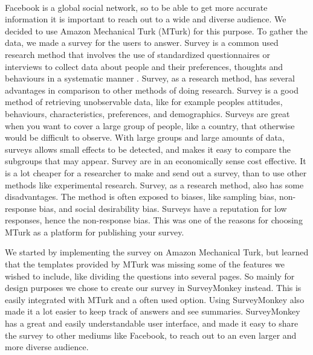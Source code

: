 \paragraph{}
Facebook is a global social network, so to be able to get more accurate information it is important to reach out to a wide and diverse audience. We decided to use Amazon Mechanical Turk (MTurk) for this purpose. To gather the data, we made a survey for the users to answer. Survey is a common used research method that involves the use of standardized questionnaires or interviews to collect data about people and their preferences, thoughts and behaviours in a systematic manner \cite{survey}. Survey, as a research method, has several advantages in comparison to other methods of doing research. Survey is a good method of retrieving unobservable data, like for example peoples attitudes, behaviours, characteristics, preferences, and demographics. Surveys are great when you want to cover a large group of people, like a country, that otherwise would be difficult to observe. With large groups and large amounts of data, surveys allows small effects to be detected, and makes it easy to compare the subgroups that may appear. Survey are in an economically sense cost effective. It is a lot cheaper for a researcher to make and send out a survey, than to use other methods like experimental research. Survey, as a research method, also has some disadvantages. The method is often exposed to biases, like sampling bias, non-response bias, and social desirability bias. Surveys have a reputation for low responses, hence the non-response bias. This was one of the reasons for choosing MTurk as a platform for publishing your survey. 

We started by implementing the survey on Amazon Mechanical Turk, but learned that the templates provided by MTurk was missing some of the features we wished to include, like dividing the questions into several pages. So mainly for design purposes we chose to create our survey in SurveyMonkey instead. This is easily integrated with MTurk and a often used option. Using SurveyMonkey also made it a lot easier to keep track of answers and see summaries. SurveyMonkey has a great and easily understandable user interface, and made it easy to share the survey to other mediums like Facebook, to reach out to an even larger and more diverse audience. 

